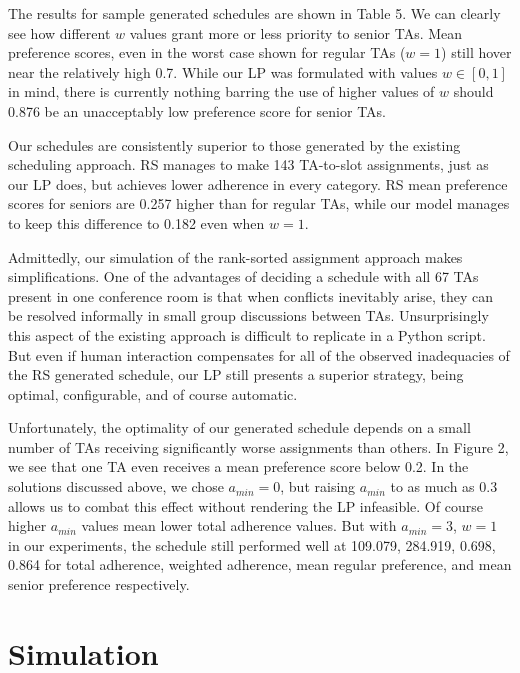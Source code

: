 \documentclass{article}
\begin{document}
\begin{multicols}{2}
The results for sample generated schedules are shown in Table 5. We can clearly see how different $w$ values grant more or less priority to senior TAs. Mean preference scores, even in the worst case shown for regular TAs ($w = 1$) still hover near the relatively high 0.7. While our LP was formulated with values $w \in [0,1]$ in mind, there is currently nothing barring the use of higher values of $w$ should 0.876 be an unacceptably low preference score for senior TAs.

Our schedules are consistently superior to those generated by the existing scheduling approach. RS manages to make 143 TA-to-slot assignments, just as our LP does, but achieves lower adherence in every category. RS mean preference scores for seniors are 0.257 higher than for regular TAs, while our model manages to keep this difference to 0.182 even when $w=1$.

Admittedly, our simulation of the rank-sorted assignment approach makes simplifications. One of the advantages of deciding a schedule with all 67 TAs present in one conference room is that when conflicts inevitably arise, they can be resolved informally in small group discussions between TAs. Unsurprisingly this aspect of the existing approach is difficult to replicate in a Python script. But even if human interaction compensates for all of the observed inadequacies of the RS generated schedule, our LP still presents a superior strategy, being optimal, configurable, and of course automatic.

Unfortunately, the optimality of our generated schedule depends on a small number of TAs receiving significantly worse assignments than others. In Figure 2, we see that one TA even receives a mean preference score below 0.2. In the solutions discussed above, we chose $a_{min} = 0$, but raising $a_{min}$ to as much as 0.3 allows us to combat this effect without rendering the LP infeasible. Of course higher $a_{min}$ values mean lower total adherence values. But with $a_{min} = 3$, $w = 1$ in our experiments, the schedule still performed well at 109.079, 284.919, 0.698, 0.864 for total adherence, weighted adherence, mean regular preference, and mean senior preference respectively.

\section*{Simulation}


\end{multicols}
\end{document}
